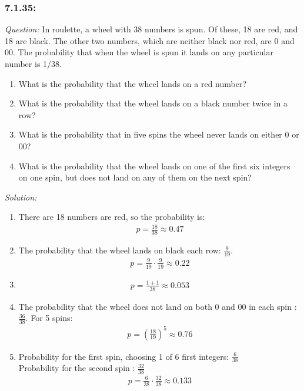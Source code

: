 \documentclass[a4paper]{article}
\begin{document}
	\subsubsection*{7.1.35:}
	\textit{Question:} In roulette, a wheel with 38 numbers is spun. Of these, 18 are red, and 18 are black. The other two numbers, which are neither black nor red, are 0 and 00. The probability that when the wheel is spun it lands on any particular number is 1/38.
	\begin{enumerate}[label = (\alph*)]
		\item What is the probability that the wheel lands on a red number?
		\item What is the probability that the wheel lands on a black number twice in a row?
		\item What is the probability that in five spins the wheel never lands on either 0 or 00?
		\item What is the probability that the wheel lands on one of the first six integers on one spin, but does not land on any of them on the next spin?
	\end{enumerate} 
	\textit{Solution:} 
	\begin{enumerate}[label = (\alph*)]
		\item There are 18 numbers are red, so the probability is:
		\begin{align*}
		p = \frac{18}{38} \approx 0.47
		\end{align*}
		\item The probability that the wheel lands on black each row: $\frac{9}{19}$.
		\begin{align*}
		p = \frac{9}{19}\cdot\frac{9}{19} \approx 0.22
		\end{align*}
		\item
		\begin{align*}
		p = \frac{1+1}{38} \approx 0.053
		\end{align*}
		\item The probability that the wheel does not land on both 0 and 00 in each spin : $\frac{36}{38}$. For 5 spins:
		\begin{align*}
		p = (\frac{18}{19})^{5} \approx 0.76
		\end{align*}
		\item Probability for the first spin, choosing 1 of 6 first integers: $\frac{6}{38}$ \\
		Probability for the second spin : $\frac{32}{38}$
		\begin{align*}
		p = \frac{6}{38}\cdot\frac{32}{38} \approx 0.133
		\end{align*}
	\end{enumerate}
	
\end{document}
